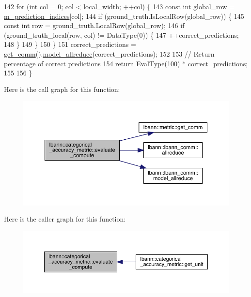 \begin{DoxyCode}
142   \textcolor{keywordflow}{for} (\textcolor{keywordtype}{int} col = 0; col < local\_width; ++col) \{
143     \textcolor{keyword}{const} \textcolor{keywordtype}{int} global\_row = \hyperlink{classlbann_1_1categorical__accuracy__metric_a369a86a91f08f3ad3b12b870ccf2e427}{m\_prediction\_indices}[col];
144     \textcolor{keywordflow}{if} (ground\_truth.IsLocalRow(global\_row)) \{
145       \textcolor{keyword}{const} \textcolor{keywordtype}{int} row = ground\_truth.LocalRow(global\_row);
146       \textcolor{keywordflow}{if} (ground\_truth\_local(row, col) != DataType(0)) \{
147         ++correct\_predictions;
148       \}
149     \}
150   \}
151   correct\_predictions = \hyperlink{classlbann_1_1metric_a464120720df6bfdf91bffe353e562964}{get\_comm}().\hyperlink{classlbann_1_1lbann__comm_aebb6290d1b618eace302404291c598a5}{model\_allreduce}(correct\_predictions);
152 
153   \textcolor{comment}{// Return percentage of correct predictions}
154   \textcolor{keywordflow}{return} \hyperlink{base_8hpp_a3266f5ac18504bbadea983c109566867}{EvalType}(100) * correct\_predictions;
155 
156 \}
\end{DoxyCode}
Here is the call graph for this function\+:\nopagebreak
\begin{figure}[H]
\begin{center}
\leavevmode
\includegraphics[width=350pt]{classlbann_1_1categorical__accuracy__metric_a0ec8c3254569c9f9855675243ac51612_cgraph}
\end{center}
\end{figure}
Here is the caller graph for this function\+:\nopagebreak
\begin{figure}[H]
\begin{center}
\leavevmode
\includegraphics[width=350pt]{classlbann_1_1categorical__accuracy__metric_a0ec8c3254569c9f9855675243ac51612_icgraph}
\end{center}
\end{figure}
